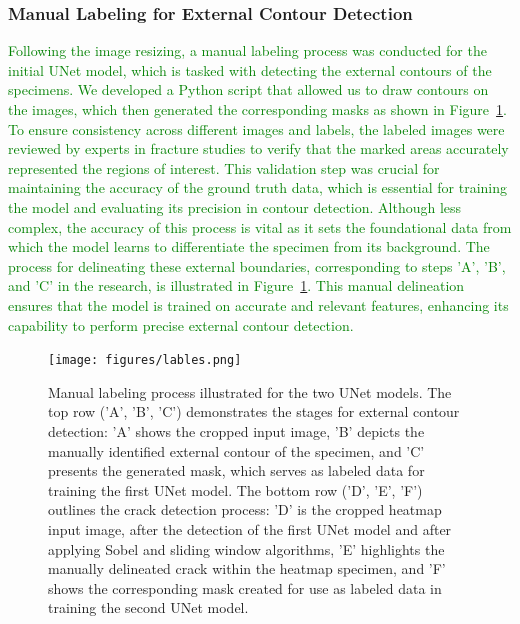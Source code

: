 \documentclass[preprint,12pt]{elsarticle}
\begin{document}
\subsubsection{Manual Labeling for External Contour Detection}
\textcolor{green}{Following the image resizing, a manual labeling process was conducted for the initial UNet model, which is tasked with detecting the external contours of the specimens. We developed a Python script that allowed us to draw contours on the images, which then generated the corresponding masks as shown in Figure~\ref{lables}. To ensure consistency across different images and labels, the labeled images were reviewed by experts in fracture studies to verify that the marked areas accurately represented the regions of interest. This validation step was crucial for maintaining the accuracy of the ground truth data, which is essential for training the model and evaluating its precision in contour detection. Although less complex, the accuracy of this process is vital as it sets the foundational data from which the model learns to differentiate the specimen from its background. The process for delineating these external boundaries, corresponding to steps 'A', 'B', and 'C' in the research, is illustrated in Figure~\ref{lables}. This manual delineation ensures that the model is trained on accurate and relevant features, enhancing its capability to perform precise external contour detection. }

\begin{figure}[h!]
  \centering
  \texttt{[image: figures/lables.png]}
  \caption{Manual labeling process illustrated for the two UNet models. The top row ('A', 'B', 'C') demonstrates the stages for external contour detection: 'A' shows the cropped input image, 'B' depicts the manually identified external contour of the specimen, and 'C' presents the generated mask, which serves as labeled data for training the first UNet model. The bottom row ('D', 'E', 'F') outlines the crack detection process: 'D' is the cropped heatmap input image, after the detection of the first UNet model and after applying Sobel and sliding window algorithms, 'E' highlights the manually delineated crack within the heatmap specimen, and 'F' shows the corresponding mask created for use as labeled data in training the second UNet model.}
  \label{lables}
\end{figure}
\end{document}
